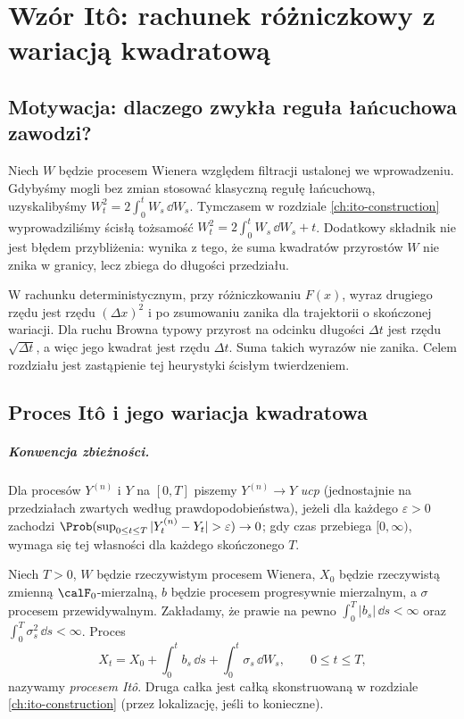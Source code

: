 \chapter{Wzór Itô: rachunek różniczkowy z wariacją kwadratową}
\label{ch:ito-formula}

\section{Motywacja: dlaczego zwykła reguła łańcuchowa zawodzi?}
Niech $W$ będzie procesem Wienera względem filtracji ustalonej
we wprowadzeniu. Gdybyśmy mogli bez zmian stosować klasyczną
regułę łańcuchową, uzyskalibyśmy
$W_t^2=2\int_0^tW_s\,\dd W_s$. Tymczasem w rozdziale
\ref{ch:ito-construction} wyprowadziliśmy ścisłą tożsamość
$W_t^2=2\int_0^tW_s\,\dd W_s+t$.
Dodatkowy składnik nie jest błędem przybliżenia: wynika z tego,
że suma kwadratów przyrostów $W$ nie znika w granicy, lecz
zbiega do długości przedziału.

W rachunku deterministycznym, przy różniczkowaniu $F(x)$,
wyraz drugiego rzędu jest rzędu $(\Delta x)^2$ i po
zsumowaniu zanika dla trajektorii o skończonej wariacji.
Dla ruchu Browna typowy przyrost na odcinku długości
$\Delta t$ jest rzędu $\sqrt{\Delta t}$, a więc jego
kwadrat jest rzędu $\Delta t$. Suma takich wyrazów nie
zanika. Celem rozdziału jest zastąpienie tej heurystyki
ścisłym twierdzeniem.

\section{Proces Itô i jego wariacja kwadratowa}
\paragraph{Konwencja zbieżności.}
Dla procesów $Y^{(n)}$ i $Y$ na $[0,T]$ piszemy
$Y^{(n)}\to Y$ \emph{ucp} (jednostajnie na przedziałach
zwartych według prawdopodobieństwa), jeżeli dla każdego
$\varepsilon>0$ zachodzi
$\Prob(\sup_{0\le t\le T}|Y_t^{(n)}-Y_t|>\varepsilon)
\to0$; gdy czas przebiega $[0,\infty)$, wymaga się
tej własności dla każdego skończonego $T$.

\begin{definicja}
Niech $T>0$, $W$ będzie rzeczywistym procesem Wienera,
$X_0$ będzie rzeczywistą zmienną $\calF_0$-mierzalną,
$b$ będzie procesem progresywnie mierzalnym, a $\sigma$
procesem przewidywalnym. Zakładamy, że prawie na pewno
$\int_0^T|b_s|\,\dd s<\infty$ oraz
$\int_0^T\sigma_s^2\,\dd s<\infty$.
Proces
\[
X_t=X_0+\int_0^tb_s\,\dd s+\int_0^t\sigma_s\,\dd W_s,
\qquad 0\le t\le T,
\tag{3.1}\label{eq:ito-process}
\]
nazywamy \emph{procesem Itô}. Druga całka jest całką
skonstruowaną w rozdziale \ref{ch:ito-construction}
(przez lokalizację, jeśli to konieczne).
\end{definicja}

